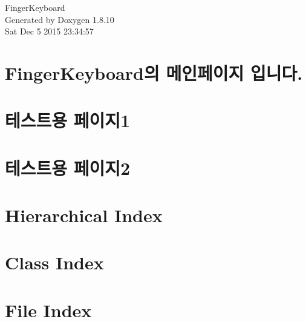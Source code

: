 \documentclass[twoside]{book}
\newcommand{\+}{\discretionary{\mbox{\scriptsize$\hookleftarrow$}}{}{}}
\newcommand{\clearemptydoublepage}{%
  \newpage{\pagestyle{empty}\cleardoublepage}%
}
\begin{document}
\hypersetup{pageanchor=false,
             bookmarks=true,
             bookmarksnumbered=true,
             pdfencoding=unicode
            }
\begin{titlepage}
\vspace*{7cm}
\begin{center}%
{\Large Finger\+Keyboard }\\
\vspace*{1cm}
{\large Generated by Doxygen 1.8.10}\\
\vspace*{0.5cm}
{\small Sat Dec 5 2015 23:34:57}\\
\end{center}
\end{titlepage}
\clearemptydoublepage
\tableofcontents
\clearemptydoublepage
{}
\hypersetup{pageanchor=true}

\chapter{Finger\+Keyboard의 메인페이지 입니다.}
\label{index}\hypertarget{index}{}
\chapter{테스트용 페이지1}
\label{page1}
\hypertarget{page1}{}

\chapter{테스트용 페이지2}
\label{page2}
\hypertarget{page2}{}

\chapter{Hierarchical Index}

\chapter{Class Index}

\chapter{File Index}

\end{document}
